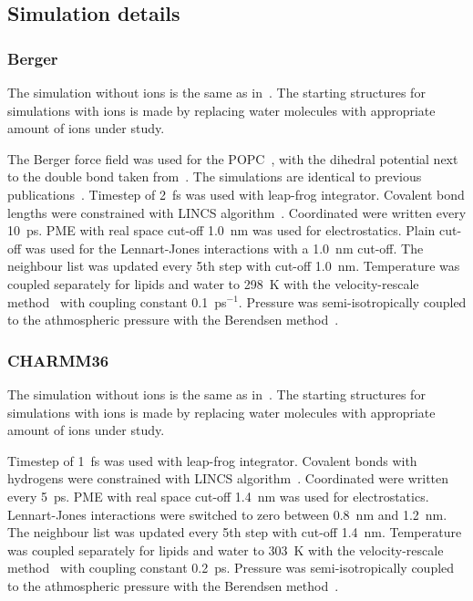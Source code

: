\documentclass[pre,aps,floatfix,authordate1-4,twocolumn]{revtex4-1}
\begin{document}


\subsection{Simulation details}
\subsubsection{Berger}
The simulation without ions is the same as in~\cite{botan15}. The starting structures for simulations with ions is
made by replacing water molecules with appropriate amount of ions under study.

The Berger force field was used for the POPC~\cite{berger97}, with the dihedral potential next to the double bond 
taken from~\cite{bachar04}. The simulations are identical to previous publications~\cite{ollila07a,ferreira13,ferreira15}.
Timestep of 2~fs was used with leap-frog integrator. Covalent bond lengths were constrained with LINCS algorithm~\cite{hess97,hess07}. 
Coordinated were written every 10~ps. PME with real space cut-off 1.0~nm was used 
for electrostatics. Plain cut-off was used for the Lennart-Jones interactions with a 1.0~nm cut-off.
The neighbour list was updated every 5th step with cut-off 1.0~nm. Temperature was coupled separately
for lipids and water to 298~K with the velocity-rescale method~\cite{bussi07} with coupling constant 0.1~ps$^{-1}$.
Pressure was semi-isotropically coupled to the athmospheric pressure with the Berendsen method~\cite{berendsen84}.


\subsubsection{CHARMM36}
The simulation without ions is the same as in~\cite{botan15}. The starting structures for simulations with ions is
made by replacing water molecules with appropriate amount of ions under study.

Timestep of 1~fs was used with leap-frog integrator. Covalent bonds with hydrogens were constrained with LINCS algorithm~\cite{hess97,hess07}. 
Coordinated were written every 5~ps. PME with real space cut-off 1.4~nm was used 
for electrostatics. Lennart-Jones interactions were switched to zero between 0.8~nm and 1.2~nm.
The neighbour list was updated every 5th step with cut-off 1.4~nm. Temperature was coupled separately
for lipids and water to 303~K with the velocity-rescale method~\cite{bussi07} with coupling constant 0.2~ps.
Pressure was semi-isotropically coupled to the athmospheric pressure with the Berendsen method~\cite{berendsen84}.
\end{document}
